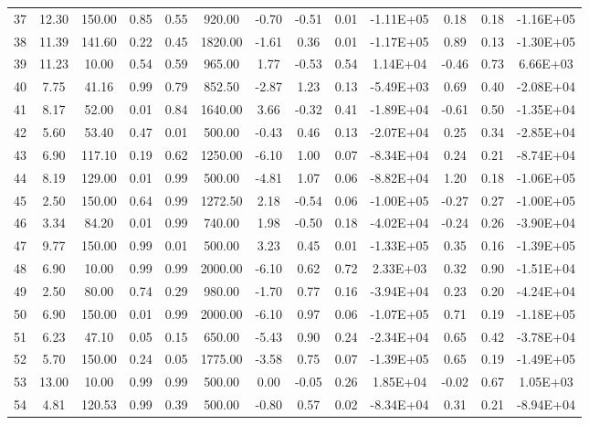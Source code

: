 \begin{landscape}
\begin{center}
\begin{longtable}{|c|c|c|c|c|c|c|c|c|c|c|c|c|}
37 & 12.30 & 150.00 & 0.85 & 0.55 & 920.00  & -0.70 & -0.51 & 0.01 & -1.11E+05 & 0.18  & 0.18 & -1.16E+05 \\
38 & 11.39 & 141.60 & 0.22 & 0.45 & 1820.00 & -1.61 & 0.36  & 0.01 & -1.17E+05 & 0.89  & 0.13 & -1.30E+05 \\
39 & 11.23 & 10.00  & 0.54 & 0.59 & 965.00  & 1.77  & -0.53 & 0.54 & 1.14E+04  & -0.46 & 0.73 & 6.66E+03  \\
40 & 7.75  & 41.16  & 0.99 & 0.79 & 852.50  & -2.87 & 1.23  & 0.13 & -5.49E+03 & 0.69  & 0.40 & -2.08E+04 \\
41 & 8.17  & 52.00  & 0.01 & 0.84 & 1640.00 & 3.66  & -0.32 & 0.41 & -1.89E+04 & -0.61 & 0.50 & -1.35E+04 \\
42 & 5.60  & 53.40  & 0.47 & 0.01 & 500.00  & -0.43 & 0.46  & 0.13 & -2.07E+04 & 0.25  & 0.34 & -2.85E+04 \\
43 & 6.90  & 117.10 & 0.19 & 0.62 & 1250.00 & -6.10 & 1.00  & 0.07 & -8.34E+04 & 0.24  & 0.21 & -8.74E+04 \\
44 & 8.19  & 129.00 & 0.01 & 0.99 & 500.00  & -4.81 & 1.07  & 0.06 & -8.82E+04 & 1.20  & 0.18 & -1.06E+05 \\
45 & 2.50  & 150.00 & 0.64 & 0.99 & 1272.50 & 2.18  & -0.54 & 0.06 & -1.00E+05 & -0.27 & 0.27 & -1.00E+05 \\
46 & 3.34  & 84.20  & 0.01 & 0.99 & 740.00  & 1.98  & -0.50 & 0.18 & -4.02E+04 & -0.24 & 0.26 & -3.90E+04 \\
47 & 9.77  & 150.00 & 0.99 & 0.01 & 500.00  & 3.23  & 0.45  & 0.01 & -1.33E+05 & 0.35  & 0.16 & -1.39E+05 \\
48 & 6.90  & 10.00  & 0.99 & 0.99 & 2000.00 & -6.10 & 0.62  & 0.72 & 2.33E+03  & 0.32  & 0.90 & -1.51E+04 \\
49 & 2.50  & 80.00  & 0.74 & 0.29 & 980.00  & -1.70 & 0.77  & 0.16 & -3.94E+04 & 0.23  & 0.20 & -4.24E+04 \\
50 & 6.90  & 150.00 & 0.01 & 0.99 & 2000.00 & -6.10 & 0.97  & 0.06 & -1.07E+05 & 0.71  & 0.19 & -1.18E+05 \\
51 & 6.23  & 47.10  & 0.05 & 0.15 & 650.00  & -5.43 & 0.90  & 0.24 & -2.34E+04 & 0.65  & 0.42 & -3.78E+04 \\
52 & 5.70  & 150.00 & 0.24 & 0.05 & 1775.00 & -3.58 & 0.75  & 0.07 & -1.39E+05 & 0.65  & 0.19 & -1.49E+05 \\
53 & 13.00 & 10.00  & 0.99 & 0.99 & 500.00  & 0.00  & -0.05 & 0.26 & 1.85E+04  & -0.02 & 0.67 & 1.05E+03  \\
54 & 4.81  & 120.53 & 0.99 & 0.39 & 500.00  & -0.80 & 0.57  & 0.02 & -8.34E+04 & 0.31  & 0.21 & -8.94E+04 \\

\end{longtable}
\end{center}
\end{landscape}
